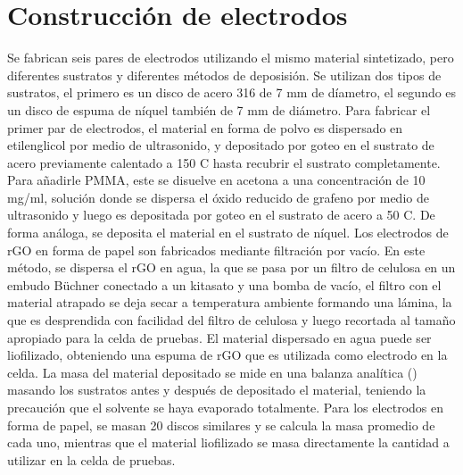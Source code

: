 \section{Construcción de electrodos}
Se fabrican seis pares de electrodos utilizando el mismo material sintetizado, pero diferentes sustratos y diferentes métodos de deposisión. Se utilizan dos tipos de sustratos, el primero es un disco de acero 316 de 7 mm de díametro, el segundo es un disco de espuma de níquel también de 7 mm de diámetro. Para fabricar el primer par de electrodos, el material en forma de polvo es dispersado en etilenglicol por medio de ultrasonido, y depositado por goteo en el sustrato de acero previamente calentado a 150 \degree C hasta recubrir el sustrato completamente. Para añadirle PMMA, este se disuelve en acetona a una concentración de 10 mg/ml, solución donde se dispersa el óxido reducido de grafeno por medio de ultrasonido y luego es depositada por goteo en el sustrato de acero a 50 \degree C. De forma análoga, se deposita el material en el sustrato de níquel.
Los electrodos de rGO en forma de papel son fabricados mediante filtración por vacío. En este método, se dispersa el rGO en agua, la que se pasa por un filtro de celulosa en un embudo Büchner conectado a un kitasato y una bomba de vacío, el filtro con el material atrapado se deja secar a temperatura ambiente formando una lámina, la que es desprendida con facilidad del filtro de celulosa y luego recortada al tamaño apropiado para la celda de pruebas. El material dispersado en agua puede ser liofilizado, obteniendo una espuma de rGO que es utilizada como electrodo en la celda.
La masa del material depositado se mide en una balanza analítica () masando los sustratos antes y después de depositado el material, teniendo la precaución que el solvente se haya evaporado totalmente. Para los electrodos en forma de papel, se masan 20 discos similares y se calcula la masa promedio de cada uno, mientras que el material liofilizado se masa directamente la cantidad a utilizar en la celda de pruebas.

